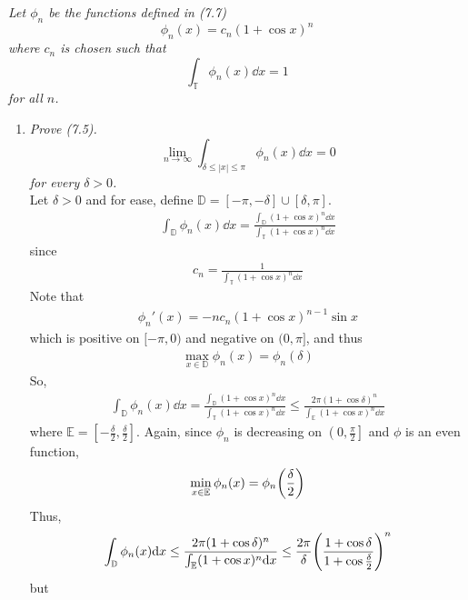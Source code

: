 \documentclass[fontsize=11pt]{article} %
\theoremstyle{plain}
\numberwithin{equation}{section} %
\numberwithin{figure}{section} %
\numberwithin{table}{section} %
\begin{document}
\emph{Let $\phi_n$ be the functions defined in (7.7) $$\phi_n(x) = c_n(1 + \cos x)^n$$ where $c_n$ is chosen such that $$\int_\mathbb{T}\phi_n(x) \dd x = 1$$ for all $n$.}
\begin{enumerate}[\bf (a)]
    \item
        \emph{Prove (7.5).  $$\lim_{n\rightarrow \infty}\int_{\delta\leq|x|\leq \pi}\phi_n(x) \dd x = 0$$ for every $\delta > 0$.} \\

        Let $\delta > 0$ and for ease, define $\mathbb{D} = [-\pi, -\delta]\cup[\delta, \pi]$.  
        \begin{align*}
            \int_\mathbb{D} \phi_n(x)\dd x = \frac{\int_\mathbb{D} (1 + \cos x)^n \dd x}{\int_\mathbb{T} (1 + \cos x)^n\dd x}
        \end{align*}
        since
        \begin{align*}
            c_n = \frac{1}{\int_\mathbb{T}(1 + \cos x)^n\dd x}
        \end{align*}
        Note that
        \begin{align*}
            \phi_n'(x) = -nc_n(1 + \cos x)^{n-1}\sin x
        \end{align*}
        which is positive on $[-\pi, 0)$ and negative on $(0, \pi]$, and thus
        \begin{align*}
            \max_{x \in \mathbb{D}}\phi_n(x) = \phi_n(\delta)
        \end{align*}
        So,
        \begin{align*}
            \int_\mathbb{D}\phi_n(x) \dd x = \frac{\int_\mathbb{D} (1 + \cos x)^n \dd x}{\int_\mathbb{T} (1 + \cos x)^n \dd x} \leq \frac{2\pi (1 + \cos \delta)^n}{\int_\mathbb{E}(1 + \cos x)^n \dd x}
        \end{align*}
        where $\mathbb{E} = [-\frac{\delta}{2}, \frac{\delta}{2}]$.  Again, since $\phi_n$ is decreasing on $\left(0, \frac{\pi}{2}\right]$ and $\phi$ is an even function,
        \begin{align*}
            \min_{x\in\mathbb{E}}\phi_n(x) = \phi_n\qty(\frac{\delta}{2})
        \end{align*}
        Thus,
        \begin{align*}
            \int_\mathbb{D}\phi_n(x) \dd x \leq \frac{2\pi (1 + \cos \delta)^n}{\int_\mathbb{E}(1 + \cos x)^n \dd x} \leq \frac{2\pi}{\delta}\qty(\frac{1 + \cos \delta}{1 + \cos \frac{\delta}{2}})^n
        \end{align*}
        but
        \begin{align*}

\end{align*}
\end{enumerate}
\end{document}
